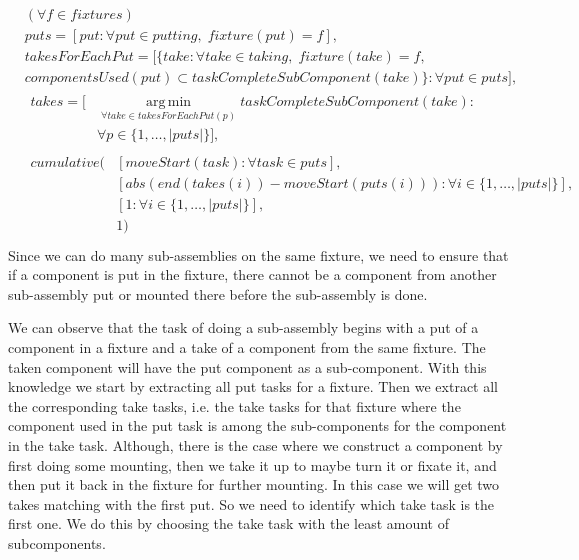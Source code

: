  \begin{equation}
 \begin{aligned}\label{eq:100}
 &(\forall f \in fixtures) \\
 &puts = [put : \forall put \in putting, \; fixture(put) = f], \\
 &takesForEachPut = [\{take : \forall take \in taking, \; fixture(take) = f, \\
 &componentsUsed(put) \subset taskCompleteSubComponent(take)\} : \forall put \in puts], \\
 &\begin{aligned}
 takes = [&\operatorname*{arg\,min}_{\forall take \in takesForEachPut(p)}{taskCompleteSubComponent(take)} : \\
 &\forall p \in \{1 , \ldots , |puts|\}], 
 \end{aligned}\\
 &\begin{aligned}
 cumulative(&[moveStart(task) : \forall task \in puts], \\ &[abs(end(takes(i))-moveStart(puts(i))) : \forall i \in \{1 , \ldots , |puts|\}], \\
 &[1 : \forall i \in \{1 , \ldots , |puts|\}],\\
 &1)
 \end{aligned}\\
 \end{aligned}
 \end{equation}
 Since we can do many sub-assemblies on the same fixture, we need to ensure that if a component is put in the fixture, there cannot be a component from another sub-assembly put or mounted there before the sub-assembly is done.
 
 We can observe that the task of doing a sub-assembly begins with a put of a component in a fixture and a take of a component from the same fixture. The taken component will have the put component as a sub-component. With this knowledge we start by extracting all put tasks for a fixture. Then we extract all the corresponding take tasks, i.e. the take tasks for that fixture where the component used in the put task is among the sub-components for the component in the take task. Although, there is the case where we construct a component by first doing some mounting, then we take it up to maybe turn it or fixate it, and then put it back in the fixture for further mounting. In this case we will get two takes matching with the first put. So we need to identify which take task is the first one. We do this by choosing the take task with the least amount of subcomponents.
 
